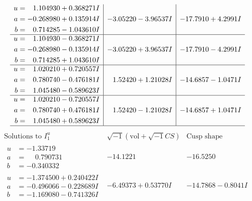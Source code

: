 \documentclass[1p]{elsarticle_modified}
\theoremstyle{definition}
\newcommand{\I}{\sqrt{-1}}
\begin{document}
$$\begin{array}{c|c|c}
\begin{aligned}
u &= \phantom{-}1.104930 + 0.368271 I \\
a &= -0.268980 + 0.135914 I \\
b &= \phantom{-}0.714285 - 1.043610 I\end{aligned}
 & -3.05220 - 3.96537 I & -17.7910 + 4.2991 I \\ \hline\begin{aligned}
u &= \phantom{-}1.104930 - 0.368271 I \\
a &= -0.268980 - 0.135914 I \\
b &= \phantom{-}0.714285 + 1.043610 I\end{aligned}
 & -3.05220 + 3.96537 I & -17.7910 - 4.2991 I \\ \hline\begin{aligned}
u &= \phantom{-}1.020210 + 0.720557 I \\
a &= \phantom{-}0.780740 - 0.476181 I \\
b &= \phantom{-}1.045480 - 0.589623 I\end{aligned}
 & \phantom{-}1.52420 + 1.21028 I & -14.6857 - 1.0471 I \\ \hline\begin{aligned}
u &= \phantom{-}1.020210 - 0.720557 I \\
a &= \phantom{-}0.780740 + 0.476181 I \\
b &= \phantom{-}1.045480 + 0.589623 I\end{aligned}
 & \phantom{-}1.52420 - 1.21028 I & -14.6857 + 1.0471 I\\
 \hline 
 \end{array}$$\newpage$$\begin{array}{c|c|c}  
\text{Solutions to }I^u_{1}& \I (\text{vol} + \sqrt{-1}CS) & \text{Cusp shape}\\
 \hline 
\begin{aligned}
u &= -1.33719\phantom{ +0.000000I} \\
a &= \phantom{-}0.790731\phantom{ +0.000000I} \\
b &= -0.340332\phantom{ +0.000000I}\end{aligned}
 & -14.1221\phantom{ +0.000000I} & -16.5250\phantom{ +0.000000I} \\ \hline\begin{aligned}
u &= -1.374500 + 0.240422 I \\
a &= -0.496066 - 0.228689 I \\
b &= -1.169080 - 0.741326 I\end{aligned}
 & -6.49373 + 0.53770 I & -14.7868 - 0.8041 I \\ \hline\begin{aligned}

\end{aligned}
\end{array}$$
\end{document}
